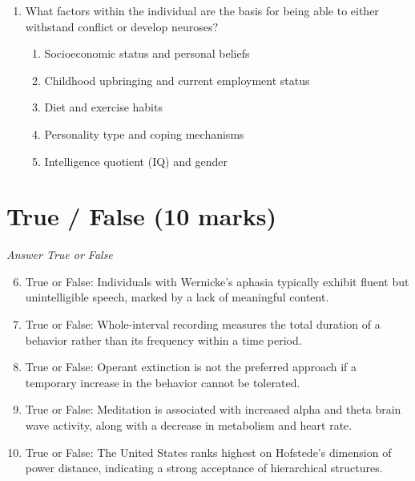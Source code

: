 \documentclass[12pt]{article}
\begin{document}
\begin{enumerate}[label=\arabic*.]
\begin{enumerate}[label=(\alph*)]
    \item solely by their physical needs
    \item striving for self-actualization and personal growth
    \item primary (physical) and secondary (emotional) needs
    \item a constant state of dissatisfaction
    \item desire for power and dominance over others
\end{enumerate}
\item What factors within the individual are the basis for being able to either withstand conflict or develop neuroses?
\begin{enumerate}[label=(\alph*)]
    \item Socioeconomic status and personal beliefs
    \item Childhood upbringing and current employment status
    \item Diet and exercise habits
    \item Personality type and coping mechanisms
    \item Intelligence quotient (IQ) and gender
\end{enumerate}
\end{enumerate}

\section*{True / False (10 marks)}
\textit{Answer True or False}
\begin{enumerate}[label=\arabic*.]
\setcounter{enumi}{5}
\item True or False: Individuals with Wernicke's aphasia typically exhibit fluent but unintelligible speech, marked by a lack of meaningful content.
\item True or False: Whole-interval recording measures the total duration of a behavior rather than its frequency within a time period.
\item True or False: Operant extinction is not the preferred approach if a temporary increase in the behavior cannot be tolerated.
\item True or False: Meditation is associated with increased alpha and theta brain wave activity, along with a decrease in metabolism and heart rate.
\item True or False: The United States ranks highest on Hofstede's dimension of power distance, indicating a strong acceptance of hierarchical structures.
\end{enumerate}
\end{document}
